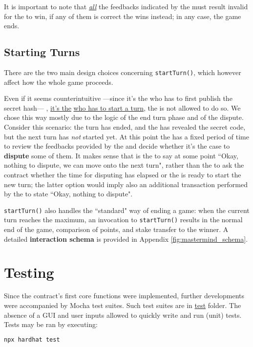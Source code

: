 It is important to note that \textit{\ul{all}} the feedbacks indicated by the  must result invalid for the  to win, if any of them is correct the  wins instead;
in any case, the game ends.

\subsection{Starting Turns}
\label{sec:startTurn}

There are the two main design choices concerning \lstinline{startTurn()}, which however affect how the whole game proceeds.
\nl

Even if it seems counterintuitive ---since it's the  who has to first publish the secret hash--- , \ul{it's the} \ul{who has to start a turn}, the  is not allowed to do so.
We chose this way mostly due to the logic of the end turn phase and of the dispute.\\
Consider this scenario: the turn has ended, and the  has revealed the secret code, but the next turn has \textit{not} started yet.
At this point the  has a fixed period of time to review the feedbacks provided by the  and decide whether it's the case to \textbf{dispute} some of them. 
It makes sense that is the  to say at some point ``Okay, nothing to dispute, we can move onto the next turn", rather than the  to ask the contract whether the time for disputing has elapsed or the  is ready to start the new turn;
the latter option would imply also an additional transaction performed by the  to state ``Okay, nothing to dispute".

\lstinline{startTurn()} also handles the ``standard" way of ending a game: when the current turn reaches the maximum, an invocation to \lstinline{startTurn()} results in the normal end of the game, comparison of points, and stake transfer to the winner. A detailed \textbf{interaction schema} is provided in Appendix \ref{fig:mastermind_schema}.
{\ns{}}

\section{Testing}

Since the contract's first core functions were implemented, further developments were accompanied by Mocha test suites.
Such test suites are in \href{https://github.com/frenzis01/mastermind/tree/6b5accf8a56b1935e354d0887ca133f5b1482c09/test}{test} folder.
The absence of a GUI and user inputs allowed to quickly write and run (unit) tests.
Tests may be ran by executing:
\begin{lstlisting}[language=bash]
npx hardhat test
\end{lstlisting}

